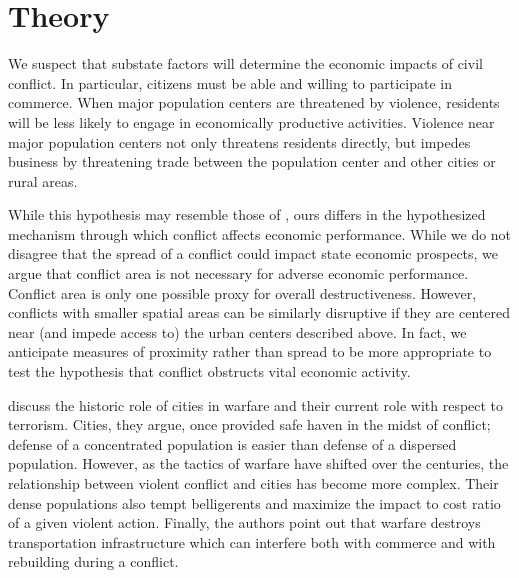 \section{Theory}
\label{theory}



We suspect that substate factors will determine the economic impacts of civil conflict. In particular, citizens must be able and willing to participate in commerce. When major population centers are threatened by violence, residents will be less likely to engage in economically productive activities. Violence near major population centers not only threatens residents directly, but impedes business by threatening trade between the population center and other cities or rural areas. 


While this hypothesis may resemble those of \cite{imai:weinstein:2000}, ours differs in the hypothesized mechanism through which conflict affects economic performance. While we do not disagree that the spread of a conflict could impact state economic prospects, we argue that conflict area is not necessary for adverse economic performance. Conflict area is only one possible proxy for overall destructiveness. However, conflicts with smaller spatial areas can be similarly disruptive if they are centered near (and impede access to) the urban centers described above. In fact, we anticipate measures of proximity rather than spread to be more appropriate to test the hypothesis that conflict obstructs vital economic activity.

\cite{glaeser:shapiro:2002} discuss the historic role of cities in warfare and their current role with respect to terrorism. Cities, they argue, once provided safe haven in the midst of conflict; defense of a concentrated population is easier than defense of a dispersed population. However, as the tactics of warfare have shifted over the centuries, the relationship between violent conflict and cities has become more complex. Their dense populations also tempt belligerents and maximize the impact to cost ratio of a given violent action. Finally, the authors point out that warfare destroys transportation infrastructure which can interfere both with commerce and with rebuilding during a conflict. 

